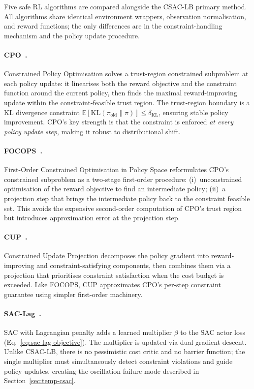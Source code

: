 Five safe RL algorithms are compared alongside the CSAC-LB primary method.
All algorithms share identical environment wrappers, observation normalisation,
and reward functions; the only differences are in the constraint-handling
mechanism and the policy update procedure.

\paragraph{CPO~\cite{achiam2017cpo}.}
Constrained Policy Optimisation solves a trust-region constrained subproblem at
each policy update: it linearises both the reward objective and the constraint
function around the current policy, then finds the maximal reward-improving
update within the constraint-feasible trust region.  The trust-region boundary
is a KL divergence constraint $\mathbb{E}[\text{KL}(\pi_{\text{old}} \| \pi)] \leq \delta_{\text{KL}}$,
ensuring stable policy improvement.  CPO's key strength is that the constraint
is enforced \emph{at every policy update step}, making it robust to
distributional shift.

\paragraph{FOCOPS~\cite{zhang2020focops}.}
First-Order Constrained Optimisation in Policy Space reformulates CPO's
constrained subproblem as a two-stage first-order procedure: (i)~unconstrained
optimisation of the reward objective to find an intermediate policy; (ii)~a
projection step that brings the intermediate policy back to the constraint
feasible set.  This avoids the expensive second-order computation of CPO's
trust region but introduces approximation error at the projection step.

\paragraph{CUP~\cite{yang2022cup}.}
Constrained Update Projection decomposes the policy gradient into reward-improving
and constraint-satisfying components, then combines them via a projection that
prioritises constraint satisfaction when the cost budget is exceeded.  Like
FOCOPS, CUP approximates CPO's per-step constraint guarantee using simpler
first-order machinery.

\paragraph{SAC-Lag~\cite{ha2020learning}.}
SAC with Lagrangian penalty adds a learned multiplier $\beta$ to the SAC
actor loss (Eq.~\ref{eq:sac-lag-objective}).  The multiplier is updated via
dual gradient descent.  Unlike CSAC-LB, there is no pessimistic cost critic
and no barrier function; the single multiplier must simultaneously detect
constraint violations and guide policy updates, creating the oscillation
failure mode described in Section~\ref{sec:temp-csac}.


